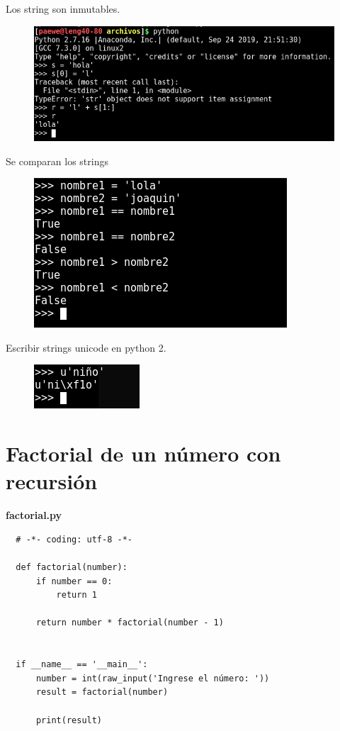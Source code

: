 \documentclass{article}
\begin{document}
Los string son inmutables.
\begin{figure}[h!]
  \centering
  \includegraphics[scale=0.75]{./Pictures/001_string_inmutable.png}
\end{figure}

Se comparan los strings

\begin{figure}[h!]
  \centering
  \includegraphics[scale=0.75]{./Pictures/002_comparar_strings.png}
\end{figure}

Escribir strings unicode en python 2.

\begin{figure}[h!]
  \centering
  \includegraphics[scale=0.75]{./Pictures/003_unicode_python2.png}
\end{figure}



\section{Factorial de un número con recursión}%

\textbf{factorial.py}
\begin{verbatim}
  # -*- coding: utf-8 -*-

  def factorial(number):
      if number == 0:
          return 1

      return number * factorial(number - 1)


  if __name__ == '__main__':
      number = int(raw_input('Ingrese el número: '))
      result = factorial(number)

      print(result)
\end{verbatim}
\end{document}
